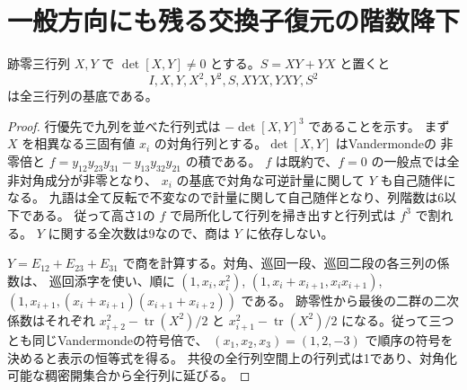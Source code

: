 \section{一般方向にも残る交換子復元の階数降下}
\label{sec:marked-persistent-bracket-defect}
\begin{lemma}\label{lem:nine-symmetric-words}
跡零三行列 $X,Y$ で $\det[X,Y]\ne0$ とする。$S=XY+YX$ と置くと
\[
                I,X,Y,X^2,Y^2,S,XYX,YXY,S^2
\]
は全三行列の基底である。
\end{lemma}
\begin{proof}
行優先で九列を並べた行列式は $-\det[X,Y]^3$ であることを示す。
まず $X$ を相異なる三固有値 $x_i$ の対角行列とする。$\det[X,Y]$ はVandermondeの
非零倍と $f=y_{12}y_{23}y_{31}-y_{13}y_{32}y_{21}$ の積である。
$f$ は既約で、$f=0$ の一般点では全非対角成分が非零となり、
$x_i$ の基底で対角な可逆計量に関して $Y$ も自己随伴になる。
九語は全て反転で不変なので計量に関して自己随伴となり、列階数は6以下である。
従って高さ1の $f$ で局所化して行列を掃き出すと行列式は $f^3$ で割れる。
$Y$ に関する全次数は9なので、商は $Y$ に依存しない。

$Y=E_{12}+E_{23}+E_{31}$ で商を計算する。対角、巡回一段、巡回二段の各三列の係数は、
巡回添字を使い、順に $(1,x_i,x_i^2)$, $(1,x_i+x_{i+1},x_ix_{i+1})$,
$(1,x_{i+1},(x_i+x_{i+1})(x_{i+1}+x_{i+2}))$ である。
跡零性から最後の二群の二次係数はそれぞれ $x_{i+2}^2-\operatorname{tr}(X^2)/2$ と
$x_{i+1}^2-\operatorname{tr}(X^2)/2$ になる。従って三つとも同じVandermondeの符号倍で、
$(x_1,x_2,x_3)=(1,2,-3)$ で順序の符号を決めると表示の恒等式を得る。
共役の全行列空間上の行列式は1であり、対角化可能な稠密開集合から全行列に延びる。
\end{proof}

